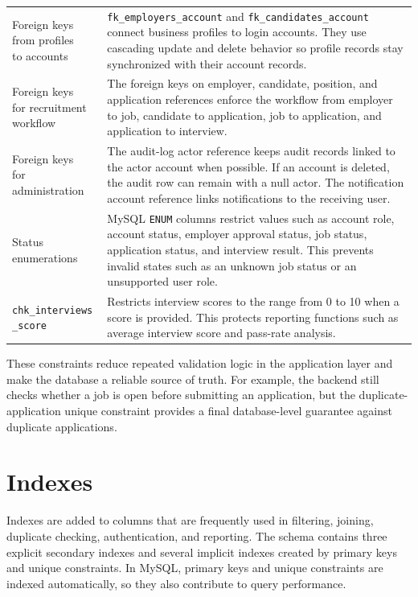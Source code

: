 \documentclass[12pt,a4paper]{report}
\makeatletter
\newcommand{\codebreak}[1]{\begin{tabular}[t]{@{}l@{}}#1\end{tabular}}
\makeatother
\begin{document}
\begin{longtable}{L{0.27\textwidth}L{0.63\textwidth}}
\codebreak{Foreign keys\\from profiles\\to accounts} & \texttt{fk\_employers\_account} and \texttt{fk\_candidates\_account} connect business profiles to login accounts. They use cascading update and delete behavior so profile records stay synchronized with their account records. \\
\codebreak{Foreign keys\\for recruitment\\workflow} & The foreign keys on employer, candidate, position, and application references enforce the workflow from employer to job, candidate to application, job to application, and application to interview. \\
\codebreak{Foreign keys\\for administration} & The audit-log actor reference keeps audit records linked to the actor account when possible. If an account is deleted, the audit row can remain with a null actor. The notification account reference links notifications to the receiving user. \\
Status enumerations & MySQL \texttt{ENUM} columns restrict values such as account role, account status, employer approval status, job status, application status, and interview result. This prevents invalid states such as an unknown job status or an unsupported user role. \\
\codebreak{\texttt{chk\_interviews}\\\texttt{\_score}} & Restricts interview scores to the range from 0 to 10 when a score is provided. This protects reporting functions such as average interview score and pass-rate analysis. \\
\bottomrule
\end{longtable}

These constraints reduce repeated validation logic in the application layer and make the database a reliable source of truth. For example, the backend still checks whether a job is open before submitting an application, but the duplicate-application unique constraint provides a final database-level guarantee against duplicate applications.

\section{Indexes}

Indexes are added to columns that are frequently used in filtering, joining, duplicate checking, authentication, and reporting. The schema contains three explicit secondary indexes and several implicit indexes created by primary keys and unique constraints. In MySQL, primary keys and unique constraints are indexed automatically, so they also contribute to query performance.
\end{document}
